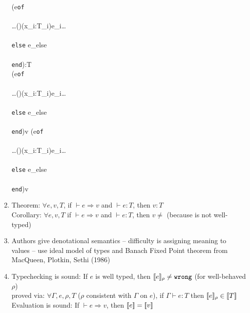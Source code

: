 \documentclass[12pt]{article}	%
\begin{document}
\begin{enumerate}
	          {\Gamma\vdash(\typecase\;e\;\texttt{of} \\\\
	                        \ldots()(x_i:T_i)\;e_i\ldots\\\\
	                        \texttt{else}\; e_{else}\\\\
	                        \texttt{end}):T}\\
	           {\vdash(\typecase\;e\;\texttt{of}\\\\
	            \ldots()(x_i:T_i)\;e_i\ldots\\\\
	            \texttt{else}\; e_{else}\\\\
	            \texttt{end})\Rightarrow v}
	           {\vdash(\typecase\;e\;\texttt{of}\\\\
	            \ldots()(x_i:T_i)\;e_i\ldots\\\\
	            \texttt{else}\; e_{else}\\\\
	            \texttt{end})\Rightarrow v}
	\item Theorem: $\forall e, v, T$, if $\vdash e \Rightarrow v$ and $\vdash e:T$, then $v:T$\\
	      Corollary: $\forall e, v, T$ if $\vdash e \Rightarrow v$ and $\vdash e:T$, then $v \neq$ \wrong (because \wrong is not well-typed)
	\item Authors give denotational semantics -- difficulty is assigning meaning to \Dynamic values -- use ideal model of types and Banach Fixed Point theorem from MacQueen, Plotkin, Sethi (1986)
	\item Typechecking is sound: If $e$ is well typed, then $[\![e]\!]_\rho \neq \texttt{wrong}$ (for well-behaved $\rho$)\\
	                             proved via: $\forall\Gamma,e,\rho,T$ ($\rho$ consistent with $\Gamma$ on $e$), if $\Gamma\vdash e:T$ then $[\![e]\!]_\rho \in [\![T]\!]$\\
	      Evaluation is sound: If $\vdash e \Rightarrow v$, then $[\![e]\!] = [\![v]\!]$
\end{enumerate}
\end{document}
